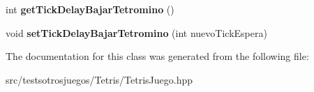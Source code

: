 \begin{DoxyCompactItemize}
\item 
int {\bfseries get\+Tick\+Delay\+Bajar\+Tetromino} ()\hypertarget{class_tetris_juego_a755d134a7631dd8c7c0e1bb2216447b7}{}\label{class_tetris_juego_a755d134a7631dd8c7c0e1bb2216447b7}

\item 
void {\bfseries set\+Tick\+Delay\+Bajar\+Tetromino} (int nuevo\+Tick\+Espera)\hypertarget{class_tetris_juego_aa48724daf9ee14de5a49097706700a75}{}\label{class_tetris_juego_aa48724daf9ee14de5a49097706700a75}

\end{DoxyCompactItemize}


The documentation for this class was generated from the following file\+:\begin{DoxyCompactItemize}
\item 
src/testsotrosjuegos/\+Tetris/Tetris\+Juego.\+hpp\end{DoxyCompactItemize}

